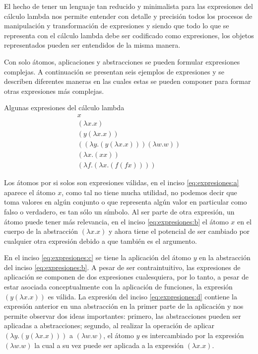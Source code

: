 El hecho de tener un lenguaje tan reducido y minimalista para las expresiones del cálculo lambda nos permite entender con detalle y precisión todos los procesos de manipulación y transformación de expresiones y siendo que todo lo que se representa con el cálculo lambda debe ser codificado como expresiones, los objetos representados pueden ser entendidos de la misma manera.

Con solo átomos, aplicaciones y abstracciones se pueden formular expresiones complejas. A continuación se presentan seis ejemplos de expresiones y se describen diferentes maneras en las cuales estas se pueden componer para formar otras expresiones más complejas.

\begin{exmp}
  Algunas expresiones del cálculo lambda
  \label{exmp:expresiones}
  \begin{subequations}
    \begin{gather}
      \label{eq:expresiones:a} \tag{a}
      x \\
      \label{eq:expresiones:b} \tag{b}
      (λx.x) \\
      \label{eq:expresiones:c} \tag{c}
      (y(λx.x)) \\
      \label{eq:expresiones:d} \tag{d}
      ((λy.(y(λx.x)))(λw.w)) \\
      \label{eq:expresiones:e} \tag{e}
      (λx.(x x)) \\
      \label{eq:expresiones:f} \tag{f}
      (λf.(λx.(f(f x))))
    \end{gather}
  \end{subequations}
\end{exmp}


Los átomos por si solos son expresiones válidas, en el inciso \eqref{eq:expresiones:a} aparece el átomo \( x \), como tal no tiene mucha utilidad, no podemos decir que toma valores en algún conjunto o que representa algún valor en particular como falso o verdadero, es tan sólo un símbolo. Al ser parte de otra expresión, un átomo puede tener más relevancia, en el inciso \eqref{eq:expresiones:b} el átomo \( x \) en el cuerpo de la abstracción \( (λx.x) \) y ahora tiene el potencial de ser cambiado por cualquier otra expresión debido a que también es el argumento.

En el inciso \eqref{eq:expresiones:c} se tiene la aplicación del átomo \( y \) en la abstracción del inciso \eqref{eq:expresiones:b}. A pesar de ser contraintuitivo, las expresiones de aplicación se componen de dos expresiones cualesquiera, por lo tanto, a pesar de estar asociada conceptualmente con la aplicación de funciones, la expresión \( (y(λx.x)) \) es válida. La expresión del inciso \eqref{eq:expresiones:d} contiene la expresión anterior en una abstracción en la primer parte de la aplicación y nos permite observar dos ideas importantes: primero, las abstracciones pueden ser aplicadas a abstracciones; segundo, al realizar la operación de aplicar \( (λy.(y(λx.x))) \) a \( (λw.w) \), el átomo \( y \) es intercambiado por la expresión \( (λw.w) \) la cual a su vez puede ser aplicada a la expresión \( (λx.x) \).

